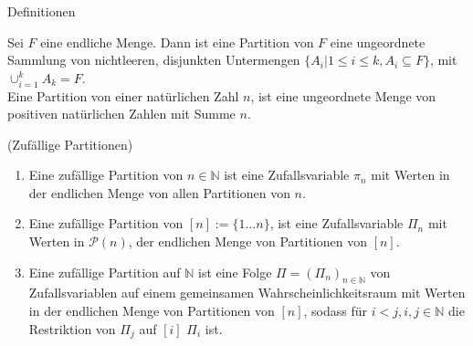 \begin{section}{Definitionen}
\begin{Definition}
   Sei $F$ eine endliche Menge. Dann ist eine Partition von $F$ eine ungeordnete Sammlung von nichtleeren, disjunkten Untermengen $\{A_i| 1 \leq i \leq k, A_i \subseteq F\}$, mit $\cup_{i=1}^{k}A_k = F$.\\
   Eine Partition von einer natürlichen Zahl $n$, ist eine ungeordnete Menge von positiven natürlichen Zahlen mit Summe $n$.
\end{Definition}
\begin{Definition}
    \textnormal{(Zufällige Partitionen)}
\begin{enumerate}
    \item Eine zufällige Partition von $n\in \mathbb{N}$ ist eine Zufallsvariable $\pi_n$ mit Werten in der endlichen Menge von allen Partitionen von $n$.
    \item Eine zufällige Partition von $[n] := \{1 ...n\}$, ist eine Zufallsvariable $\Pi_n$ mit Werten in $\mathcal{P}(n)$, der endlichen Menge von Partitionen von $[n]$.
    \item Eine zufällige Partition auf $\mathbb{N}$ ist eine Folge $\Pi = (\Pi_n)_{n\in \mathbb{N}}$ von Zufallsvariablen auf einem gemeinsamen Wahrscheinlichkeitsraum mit Werten in der endlichen Menge von Partitionen von $[n]$, sodass für $i<j, i,j \in \mathbb{N}$ die Restriktion von $\Pi_j$ auf $[i]$ $\Pi_i$ ist.
\end{enumerate}


\end{Definition}
\end{section}
